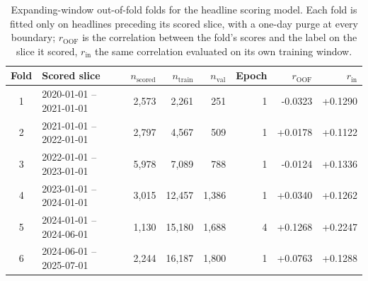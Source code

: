 \begin{table}[htbp]
\centering
\caption{Expanding-window out-of-fold folds for the headline scoring model. Each fold is fitted only on headlines preceding its scored slice, with a one-day purge at every boundary; $r_{\mathrm{OOF}}$ is the correlation between the fold's scores and the label on the slice it scored, $r_{\mathrm{in}}$ the same correlation evaluated on its own training window.}
\label{tab:finbert_oof_folds}
\begin{tabular}{clrrrrrr}
\hline
Fold & Scored slice & $n_{\mathrm{scored}}$ & $n_{\mathrm{train}}$ & $n_{\mathrm{val}}$ & Epoch & $r_{\mathrm{OOF}}$ & $r_{\mathrm{in}}$ \\
\hline
        1 & 2020-01-01 -- 2021-01-01 & 2,573 & 2,261 & 251 & 1 & -0.0323 & +0.1290 \\
        2 & 2021-01-01 -- 2022-01-01 & 2,797 & 4,567 & 509 & 1 & +0.0178 & +0.1122 \\
        3 & 2022-01-01 -- 2023-01-01 & 5,978 & 7,089 & 788 & 1 & -0.0124 & +0.1336 \\
        4 & 2023-01-01 -- 2024-01-01 & 3,015 & 12,457 & 1,386 & 1 & +0.0340 & +0.1262 \\
        5 & 2024-01-01 -- 2024-06-01 & 1,130 & 15,180 & 1,688 & 4 & +0.1268 & +0.2247 \\
        6 & 2024-06-01 -- 2025-07-01 & 2,244 & 16,187 & 1,800 & 1 & +0.0763 & +0.1288 \\
\hline
\end{tabular}
\end{table}
